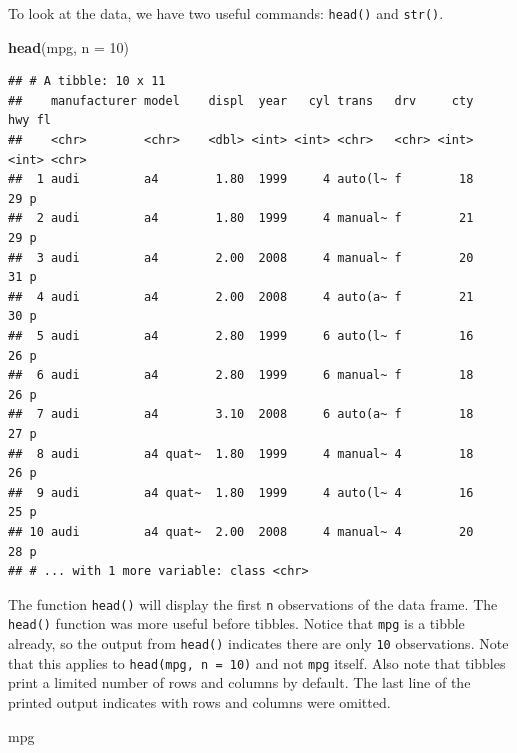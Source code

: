 \documentclass[]{book}
\newenvironment{Shaded}{\begin{snugshade}}{\end{snugshade}}
\newcommand{\KeywordTok}[1]{\textcolor[rgb]{0.13,0.29,0.53}{\textbf{#1}}}
\newcommand{\DataTypeTok}[1]{\textcolor[rgb]{0.13,0.29,0.53}{#1}}
\newcommand{\DecValTok}[1]{\textcolor[rgb]{0.00,0.00,0.81}{#1}}
\newcommand{\NormalTok}[1]{#1}
\theoremstyle{definition}
\theoremstyle{definition}
\theoremstyle{definition}
\theoremstyle{remark}
\begin{document}
To look at the data, we have two useful commands: \texttt{head()} and
\texttt{str()}.

\begin{Shaded}
\begin{Highlighting}[]
\KeywordTok{head}\NormalTok{(mpg, }\DataTypeTok{n =} \DecValTok{10}\NormalTok{)}
\end{Highlighting}
\end{Shaded}

\begin{verbatim}
## # A tibble: 10 x 11
##    manufacturer model    displ  year   cyl trans   drv     cty   hwy fl   
##    <chr>        <chr>    <dbl> <int> <int> <chr>   <chr> <int> <int> <chr>
##  1 audi         a4        1.80  1999     4 auto(l~ f        18    29 p    
##  2 audi         a4        1.80  1999     4 manual~ f        21    29 p    
##  3 audi         a4        2.00  2008     4 manual~ f        20    31 p    
##  4 audi         a4        2.00  2008     4 auto(a~ f        21    30 p    
##  5 audi         a4        2.80  1999     6 auto(l~ f        16    26 p    
##  6 audi         a4        2.80  1999     6 manual~ f        18    26 p    
##  7 audi         a4        3.10  2008     6 auto(a~ f        18    27 p    
##  8 audi         a4 quat~  1.80  1999     4 manual~ 4        18    26 p    
##  9 audi         a4 quat~  1.80  1999     4 auto(l~ 4        16    25 p    
## 10 audi         a4 quat~  2.00  2008     4 manual~ 4        20    28 p    
## # ... with 1 more variable: class <chr>
\end{verbatim}

The function \texttt{head()} will display the first \texttt{n}
observations of the data frame. The \texttt{head()} function was more
useful before tibbles. Notice that \texttt{mpg} is a tibble already, so
the output from \texttt{head()} indicates there are only \texttt{10}
observations. Note that this applies to \texttt{head(mpg,\ n\ =\ 10)}
and not \texttt{mpg} itself. Also note that tibbles print a limited
number of rows and columns by default. The last line of the printed
output indicates with rows and columns were omitted.

\begin{Shaded}
\begin{Highlighting}[]
\NormalTok{mpg}
\end{Highlighting}
\end{Shaded}
\end{document}
